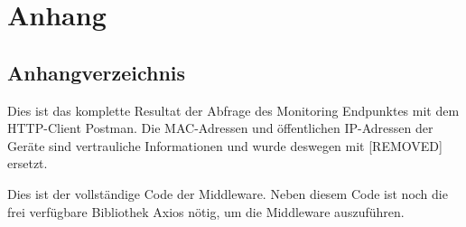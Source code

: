 \chapter*{Anhang}
\section*{Anhangverzeichnis}
\vspace{-8em}

\abstaendeanhangverzeichnis

\listofanhang
\clearpage
{} %

\label{anhang:http-abfrage}

Dies ist das komplette Resultat der Abfrage des Monitoring Endpunktes mit dem HTTP-Client Postman. Die MAC-Adressen und öffentlichen IP-Adressen der Geräte sind vertrauliche Informationen und wurde deswegen mit [REMOVED] ersetzt.

\lstset{
    breaklines=true,
    firstnumber=1 
}



\label{anhang:sourcecode}

Dies ist der vollständige Code der Middleware. Neben diesem Code ist noch die frei verfügbare Bibliothek Axios nötig, um die Middleware auszuführen.

\lstset{
    breaklines=true,
    firstnumber=1 
}


